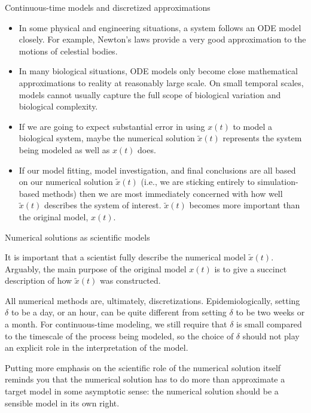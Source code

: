\begin{frame}[allowframebreaks=0.8]{Continuous-time models and discretized approximations}
  \begin{itemize}
  \item In some physical and engineering situations, a system follows an ODE model closely. For example, Newton's laws provide a very good approximation to the motions of celestial bodies. 
  \item In many biological situations, ODE models only become close mathematical approximations to reality at reasonably large scale. On small temporal scales, models cannot usually capture the full scope of biological variation and biological complexity. 
  \item If we are going to expect substantial error in using $x(t)$ to model a biological system, maybe the numerical solution $\tilde x(t)$ represents the system being modeled as well as $x(t)$  does.
  \item If our model fitting, model investigation, and final conclusions are all based on our numerical solution  $\tilde x(t)$ (i.e., we are sticking entirely to simulation-based methods) then we are most immediately concerned with how well  $\tilde x(t)$ describes the system of interest.  $\tilde x(t)$ becomes more important than the original model, $x(t)$.
  \end{itemize}
\end{frame}

\begin{frame}{Numerical solutions as scientific models}
  \bi
\item It is important that a scientist fully describe the numerical model $\tilde x(t)$. 
  Arguably, the main purpose of the original model $x(t)$ is to give a succinct description of how $\tilde x(t)$ was constructed.
\item All numerical methods are, ultimately, discretizations. Epidemiologically, setting $\delta$ to be a day, or an hour, can be quite different from setting $\delta$ to be two weeks or a month. For continuous-time modeling, we still require that $\delta$ is small compared to the timescale of the process being modeled, so the choice of $\delta$ should not play an explicit role in the interpretation of the model.
\item Putting more emphasis on the scientific role of the numerical solution itself reminds you that the numerical solution has to do more than approximate a target model in some asymptotic sense: the numerical solution should be a sensible model in its own right. 
  \ei
\end{frame}

